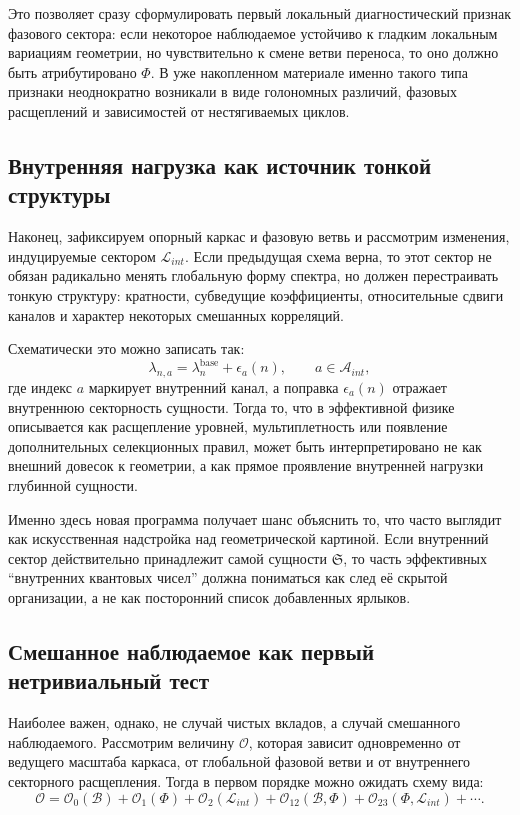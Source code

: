 \documentclass[12pt,a4paper]{article}
\begin{document}
Это позволяет сразу сформулировать первый локальный диагностический признак фазового сектора: если некоторое наблюдаемое устойчиво к гладким локальным вариациям геометрии, но чувствительно к смене ветви переноса, то оно должно быть атрибутировано \(\Phi\). В уже накопленном материале именно такого типа признаки неоднократно возникали в виде голономных различий, фазовых расщеплений и зависимостей от нестягиваемых циклов.

\subsection{Внутренняя нагрузка как источник тонкой структуры}

Наконец, зафиксируем опорный каркас и фазовую ветвь и рассмотрим изменения, индуцируемые сектором \(\mathcal{L}_{int}\). Если предыдущая схема верна, то этот сектор не обязан радикально менять глобальную форму спектра, но должен перестраивать тонкую структуру: кратности, субведущие коэффициенты, относительные сдвиги каналов и характер некоторых смешанных корреляций.

Схематически это можно записать так:
\begin{equation}
\lambda_{n,a} = \lambda_n^{\mathrm{base}} + \epsilon_a(n), \qquad a \in \mathcal{A}_{int},
\end{equation}
где индекс \(a\) маркирует внутренний канал, а поправка \(\epsilon_a(n)\) отражает внутреннюю секторность сущности. Тогда то, что в эффективной физике описывается как расщепление уровней, мультиплетность или появление дополнительных селекционных правил, может быть интерпретировано не как внешний довесок к геометрии, а как прямое проявление внутренней нагрузки глубинной сущности.

Именно здесь новая программа получает шанс объяснить то, что часто выглядит как искусственная надстройка над геометрической картиной. Если внутренний сектор действительно принадлежит самой сущности \(\mathfrak{S}\), то часть эффективных ``внутренних квантовых чисел'' должна пониматься как след её скрытой организации, а не как посторонний список добавленных ярлыков.

\subsection{Смешанное наблюдаемое как первый нетривиальный тест}

Наиболее важен, однако, не случай чистых вкладов, а случай смешанного наблюдаемого. Рассмотрим величину \(\mathcal{O}\), которая зависит одновременно от ведущего масштаба каркаса, от глобальной фазовой ветви и от внутреннего секторного расщепления. Тогда в первом порядке можно ожидать схему вида:
\begin{equation}
\mathcal{O} = \mathcal{O}_0(\mathcal{B}) + \mathcal{O}_1(\Phi) + \mathcal{O}_2(\mathcal{L}_{int}) + \mathcal{O}_{12}(\mathcal{B},\Phi) + \mathcal{O}_{23}(\Phi,\mathcal{L}_{int}) + \cdots .
\end{equation}
\end{document}
